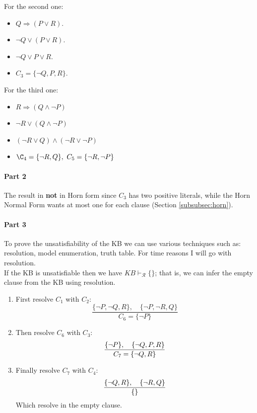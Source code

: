 \documentclass[10pt,a4paper]{article}
\newcommand{\braces}[1]{%
  \lbrace{#1}\rbrace}%
\begin{document}
\begin{itemize}
For the second one:
\begin{itemize}
\item $Q \Rightarrow (P \vee R)$.
\item $\neg Q \vee (P \vee R)$.
\item $\neg Q \vee P \vee R$.
\item $C_3= \lbrace \neg Q, P, R\rbrace$.
\end{itemize}

For the third one:
\begin{itemize}
\item $R \Rightarrow (Q \wedge \neg P)$
\item $\neg R \vee (Q \wedge \neg P)$
\item $(\neg R \vee Q) \wedge( \neg R \vee \neg P)$
\item $\C_4= \lbrace \neg R, Q\rbrace,\ C_5=\lbrace \neg R , \neg P\rbrace$

\end{itemize}

\paragraph{Part 2}
The result in \textbf{not} in Horn form since $C_3$ has two positive literals, while the Horn Normal Form wants at most one for each clause (Section \ref{subsubsec:horn}).

\paragraph{Part 3}
To prove the unsatisfiability of the KB we can use various techniques such as: resolution, model enumeration, truth table. For time reasons I will go with resolution.\\
If the KB is unsatisfiable then we have $KB \vdash_{\mathcal{R}} \{\}$; that is, we can infer the empty clause from the KB using resolution.

\begin{enumerate}
\item First resolve $C_1$ with $C_2$:
\[\frac{\lbrace \neg P, \neg Q, R \rbrace,\quad \braces{\neg P, \neg R, Q} }{C_6=\braces{\neg P}}\]
\item Then resolve $C_6$ with $C_3$:
\[\frac{\braces{\neg P},\quad \braces{\neg Q,P,R}}{C_7=\braces{\neg Q, R}}\]
\item Finally resolve $C_7$ with $C_4$:
\[\frac{\braces{\neg Q,R},\quad \braces{\neg R, Q}}{\braces{}}\]
Which resolve in the empty clause.
\end{enumerate}





\end{itemize}
\end{document}
